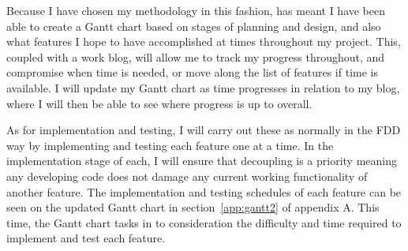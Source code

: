 Because I have chosen my methodology in this fashion, has meant I have been able to create a Gantt chart based on stages of planning and design, and also what features I hope to have accomplished at times throughout my project. This, coupled with a work blog, will allow me to track my progress throughout, and compromise when time is needed, or move along the list of features if time is available. I will update my Gantt chart as time progresses in relation to my blog, where I will then be able to see where progress is up to overall.

As for implementation and testing, I will carry out these as normally in the FDD way by implementing and testing each feature one at a time. In the implementation stage of each, I will ensure that decoupling is a priority meaning any developing code does not damage any current working functionality of another feature. The implementation and testing schedules of each feature can be seen on the updated Gantt chart in section~\ref{app:gantt2} of appendix A. This time, the Gantt chart tasks in to consideration the difficulty and time required to implement and test each feature.